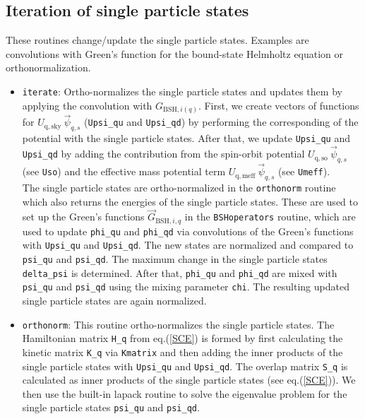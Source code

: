 \documentclass[4p]{elsarticle}
\begin{document}
\subsection{Iteration of single particle states}
These routines change/update the single particle states. Examples are convolutions with Green's function for the bound-state Helmholtz equation or orthonormalization.
\begin{itemize}
\item \texttt{iterate}: Ortho-normalizes the single particle states and updates them by applying the convolution with $G_{\mathrm{BSH},i(q)}$.
First, we create vectors of functions for $U_\mathrm{q,sky} \: \vec{\psi}_{q,s}$ (\texttt{Upsi\_qu} and \texttt{Upsi\_qd}) by performing the corresponding of the potential with the single particle states.  After that, we update \texttt{Upsi\_qu} and \texttt{Upsi\_qd} by adding the contribution from the spin-orbit potential $U_\mathrm{q, so} \: \vec{\psi}_{q,s}$ (see \texttt{Uso}) and the effective mass potential term  $U_\mathrm{q, meff} \: \vec{\psi}_{q,s}$ (see \texttt{Umeff}).\\ 
The single particle states are ortho-normalized in the \texttt{orthonorm} routine which also returns the energies of the single particle states. These are used to set up the Green's functions $\vec{G}_{\mathrm{BSH}, i, q}$ in the \texttt{BSHoperators} routine, which are used to update \texttt{phi\_qu} and \texttt{phi\_qd} via convolutions of the Green's functions with \texttt{Upsi\_qu} and \texttt{Upsi\_qd}. The new states are normalized and compared to \texttt{psi\_qu} and \texttt{psi\_qd}. The maximum change in the single particle states \texttt{delta\_psi} is determined. After that, \texttt{phi\_qu} and \texttt{phi\_qd} are mixed with \texttt{psi\_qu} and \texttt{psi\_qd} using the mixing parameter \texttt{chi}. The resulting updated single particle states are again normalized. 
\item \texttt{orthonorm}: This routine ortho-normalizes the single particle states. The Hamiltonian matrix \texttt{H\_q} from eq.(\ref{SCE}) is formed by first calculating the kinetic matrix \texttt{K\_q} via \texttt{Kmatrix} and then adding the inner products of the single particle states with \texttt{Upsi\_qu} and \texttt{Upsi\_qd}. The overlap matrix \texttt{S\_q} is calculated as inner products of the single particle states (see eq.(\ref{SCE})). We then use the built-in lapack routine to solve the eigenvalue problem for the single particle states \texttt{psi\_qu} and \texttt{psi\_qd}.\\

\end{itemize}
\end{document}
